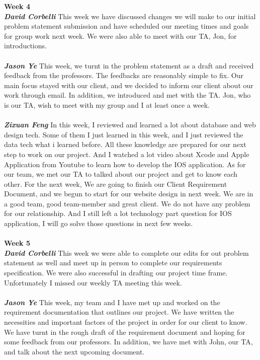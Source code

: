 \documentclass[onecolumn, draftclsnofoot,10pt, compsoc]{IEEEtran}
\begin{document}
\textbf{Week 4}
\\ \textbf{\textit{David Corbelli}}
This week we have discussed changes we will make to our initial problem statement submission and have scheduled our meeting times and goals for group work next week. We were also able to meet with our TA, Jon, for introductions.\\ \\
\textbf{\textit{Jason Ye}}
This week, we turnt in the problem statement as a draft and received feedback from the professors. The feedbacks are reasonably simple to fix. Our main focus stayed with our client, and we decided to inform our client about our work through email. In addition, we introduced and met with the TA. Jon, who is our TA, wish to meet with my group and I at least once a week.\\ \\
\textbf{\textit{Zixuan Feng}}
In this week, I reviewed and learned a lot about database and web design tech. Some of them I just learned in this week, and I just reviewed the data tech what i learned before. All these knowledge are prepared for our next step to work on our project. And I watched a lot video about Xcode and Apple Application from Youtube to learn how to develop the IOS application. As for our team, we met our TA to talked about our project and get to know each other. For the next week, We are going to finish our Client Requirement Document, and we begun to start for our website design in next week. We are in a good team, good team-member and great client. We do not have any problem for our relationship. And I still left a lot technology part question for IOS application, I will go solve those questions in next few weeks.\\ \\
\textbf{Week 5}
\\ \textbf{\textit{David Corbelli}}
This week we were able to complete our edits for out problem statement as well and meet up in person to complete our requirements specification. We were also successful in drafting our project time frame. Unfortunately I missed our weekly TA meeting this week.\\ \\
\textbf{\textit{Jason Ye}}
This week, my team and I have met up and worked on the requirement documentation that outlines our project. We have written the necessities and important factors of the project in order for our client to know. We have turnt in the rough draft of the requirement document and hoping for some feedback from our professors. In addition, we have met with John, our TA, and talk about the next upcoming document.\\ \\
\end{document}
